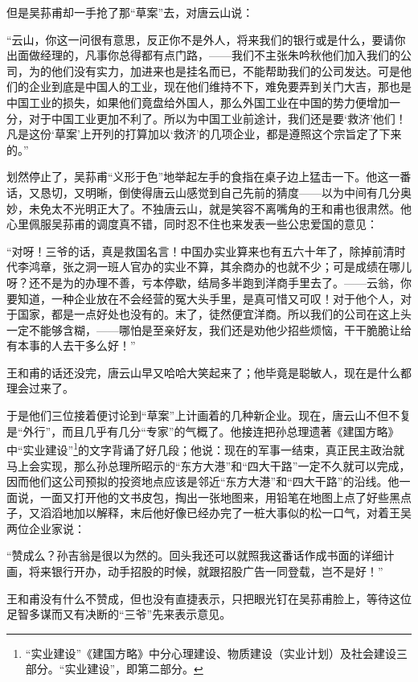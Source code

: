 \par 但是吴荪甫却一手抢了那“草案”去，对唐云山说：
\par “云山，你这一问很有意思，反正你不是外人，将来我们的银行或是什么，要请你出面做经理的，凡事你总得都有点门路，——我们不主张朱吟秋他们加入我们的公司，为的他们没有实力，加进来也是挂名而已，不能帮助我们的公司发达。可是他们的企业到底是中国人的工业，现在他们维持不下，难免要弄到关门大吉，那也是中国工业的损失，如果他们竟盘给外国人，那么外国工业在中国的势力便增加一分，对于中国工业更加不利了。所以为中国工业前途计，我们还是要‘救济’他们！凡是这份‘草案’上开列的打算加以‘救济’的几项企业，都是遵照这个宗旨定了下来的。”
\par 划然停止了，吴荪甫“义形于色”地举起左手的食指在桌子边上猛击一下。他这一番话，又恳切，又明晰，倒使得唐云山感觉到自己先前的猜度——以为中间有几分奥妙，未免太不光明正大了。不独唐云山，就是笑容不离嘴角的王和甫也很肃然。他心里佩服吴荪甫的调度真不错，同时忍不住也来发表一些公忠爱国的意见：
\par “对呀！三爷的话，真是救国名言！中国办实业算来也有五六十年了，除掉前清时代李鸿章，张之洞一班人官办的实业不算，其余商办的也就不少；可是成绩在哪儿呀？还不是为的办理不善，亏本停歇，结局多半跑到洋商手里去了。——云翁，你要知道，一种企业放在不会经营的冤大头手里，是真可惜又可叹！对于他个人，对于国家，都是一点好处也没有的。末了，徒然便宜洋商。所以我们的公司在这上头一定不能够含糊，——哪怕是至亲好友，我们还是劝他少招些烦恼，干干脆脆让给有本事的人去干多么好！”
\par 王和甫的话还没完，唐云山早又哈哈大笑起来了；他毕竟是聪敏人，现在是什么都理会过来了。
\par 于是他们三位接着便讨论到“草案”上计画着的几种新企业。现在，唐云山不但不复是“外行”，而且几乎有几分“专家”的气概了。他接连把孙总理遗著《建国方略》中“实业建设”\footnote{“实业建设”《建国方略》中分心理建设、物质建设（实业计划）及社会建设三部分。“实业建设”，即第二部分。}的文字背诵了好几段；他说：现在的军事一结束，真正民主政治就马上会实现，那么孙总理所昭示的“东方大港”和“四大干路”一定不久就可以完成，因而他们这公司预拟的投资地点应该是邻近“东方大港”和“四大干路”的沿线。他一面说，一面又打开他的文书皮包，掏出一张地图来，用铅笔在地图上点了好些黑点子，又滔滔地加以解释，末后他好像已经办完了一桩大事似的松一口气，对着王吴两位企业家说：
\par “赞成么？孙吉翁是很以为然的。回头我还可以就照我这番话作成书面的详细计画，将来银行开办，动手招股的时候，就跟招股广告一同登载，岂不是好！”
\par 王和甫没有什么不赞成，但也没有直捷表示，只把眼光钉在吴荪甫脸上，等待这位足智多谋而又有决断的“三爷”先来表示意见。
